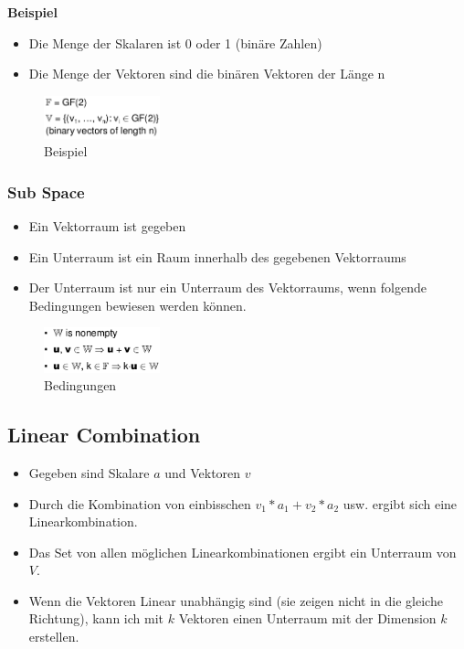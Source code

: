 \textbf{Beispiel}

\begin{itemize}
\tightlist
\item
  Die Menge der Skalaren ist 0 oder 1 (binäre Zahlen)
\item
  Die Menge der Vektoren sind die binären Vektoren der Länge n
\end{itemize}

\begin{figure}[H]
\centering
\includegraphics[width=0.3\textwidth]{figures/vektorraumBeispiel.png}
\caption{Beispiel}
\end{figure}

\hypertarget{sub-space}{%
\subsubsection{Sub Space}\label{sub-space}}

\begin{itemize}
\tightlist
\item
  Ein Vektorraum ist gegeben
\item
  Ein Unterraum ist ein Raum innerhalb des gegebenen Vektorraums
\item
  Der Unterraum ist nur ein Unterraum des Vektorraums, wenn folgende
  Bedingungen bewiesen werden können.
\end{itemize}

\begin{figure}[H]
\centering
\includegraphics[width=0.3\textwidth]{figures/subspaceRequirements.png}
\caption{Bedingungen}
\end{figure}

\hypertarget{linear-combination}{%
\subsection{Linear Combination}\label{linear-combination}}

\begin{itemize}
\tightlist
\item
  Gegeben sind Skalare $a$ und Vektoren $v$
\item
  Durch die Kombination von einbisschen $v_1 * a_1 + v_2 * a_2$ usw. ergibt
  sich eine Linearkombination.
\item
  Das Set von allen möglichen Linearkombinationen ergibt ein Unterraum
  von $V$.
\item
  Wenn die Vektoren Linear unabhängig sind (sie zeigen nicht in die
  gleiche Richtung), kann ich mit $k$ Vektoren einen Unterraum mit der
  Dimension $k$ erstellen.
\end{itemize}

